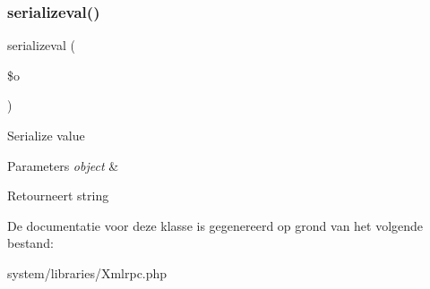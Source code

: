 \subsubsection{\texorpdfstring{serializeval()}{serializeval()}}
{\footnotesize\ttfamily serializeval (\begin{DoxyParamCaption}\item[{}]{\$o }\end{DoxyParamCaption})}

Serialize value


\begin{DoxyParams}{Parameters}
{\em object} & \\
\hline
\end{DoxyParams}
\begin{DoxyReturn}{Retourneert}
string 
\end{DoxyReturn}


De documentatie voor deze klasse is gegenereerd op grond van het volgende bestand\+:\begin{DoxyCompactItemize}
\item 
system/libraries/Xmlrpc.\+php\end{DoxyCompactItemize}
